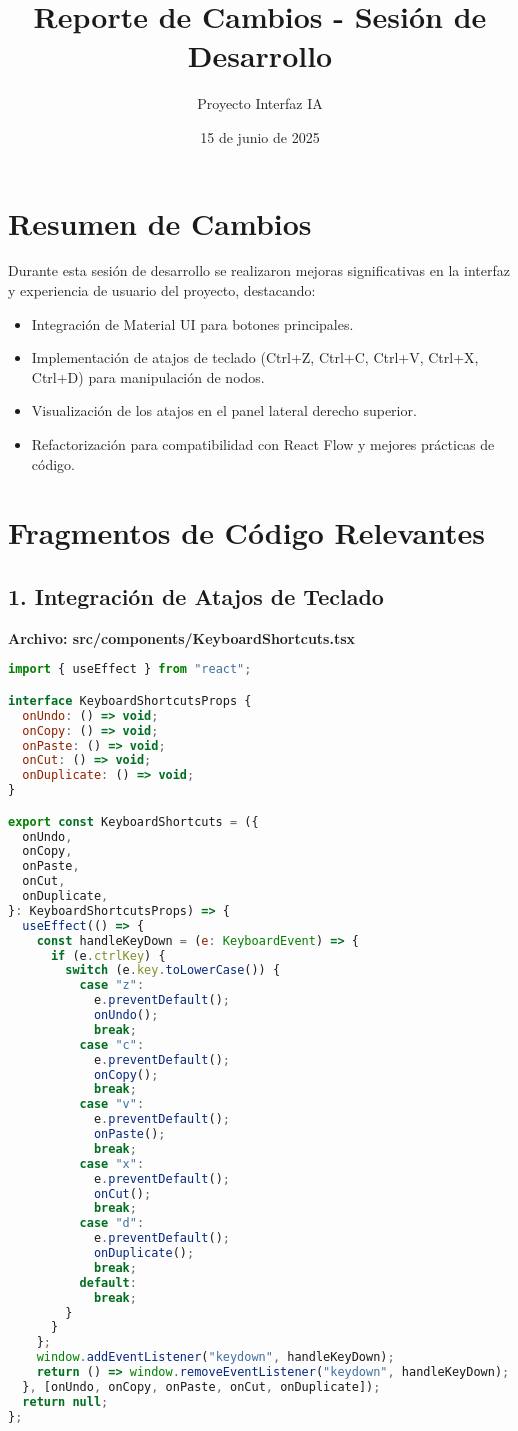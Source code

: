 \documentclass{article}
\title{Reporte de Cambios - Sesión de Desarrollo}
\author{Proyecto Interfaz IA}
\date{15 de junio de 2025}
\begin{document}
\maketitle

\section*{Resumen de Cambios}
Durante esta sesión de desarrollo se realizaron mejoras significativas en la interfaz y experiencia de usuario del proyecto, destacando:
\begin{itemize}
    \item Integración de Material UI para botones principales.
    \item Implementación de atajos de teclado (Ctrl+Z, Ctrl+C, Ctrl+V, Ctrl+X, Ctrl+D) para manipulación de nodos.
    \item Visualización de los atajos en el panel lateral derecho superior.
    \item Refactorización para compatibilidad con React Flow y mejores prácticas de código.
\end{itemize}

\section*{Fragmentos de Código Relevantes}
\subsection*{1. Integración de Atajos de Teclado}
\textbf{Archivo: src/components/KeyboardShortcuts.tsx}
\begin{lstlisting}[language=JavaScript, caption=KeyboardShortcuts.tsx]
import { useEffect } from "react";

interface KeyboardShortcutsProps {
  onUndo: () => void;
  onCopy: () => void;
  onPaste: () => void;
  onCut: () => void;
  onDuplicate: () => void;
}

export const KeyboardShortcuts = ({
  onUndo,
  onCopy,
  onPaste,
  onCut,
  onDuplicate,
}: KeyboardShortcutsProps) => {
  useEffect(() => {
    const handleKeyDown = (e: KeyboardEvent) => {
      if (e.ctrlKey) {
        switch (e.key.toLowerCase()) {
          case "z":
            e.preventDefault();
            onUndo();
            break;
          case "c":
            e.preventDefault();
            onCopy();
            break;
          case "v":
            e.preventDefault();
            onPaste();
            break;
          case "x":
            e.preventDefault();
            onCut();
            break;
          case "d":
            e.preventDefault();
            onDuplicate();
            break;
          default:
            break;
        }
      }
    };
    window.addEventListener("keydown", handleKeyDown);
    return () => window.removeEventListener("keydown", handleKeyDown);
  }, [onUndo, onCopy, onPaste, onCut, onDuplicate]);
  return null;
};
\end{lstlisting}
\end{document}
